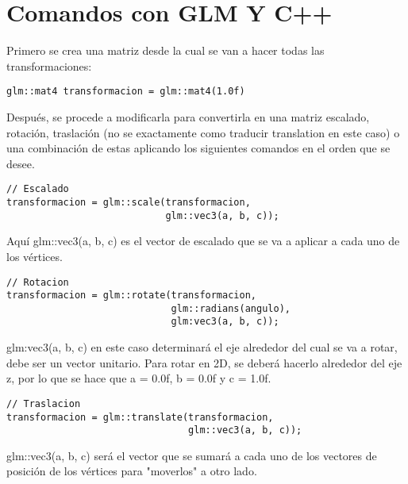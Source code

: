\section{Comandos con GLM Y C++}
Primero se crea una matriz desde la cual se van a hacer todas las
transformaciones:\par

\begin{lstlisting}
glm::mat4 transformacion = glm::mat4(1.0f)
\end{lstlisting}\par

Después, se procede a modificarla para convertirla en una matriz escalado, rotación, traslación 
(no se exactamente como traducir translation en este caso) o una combinación de estas aplicando
los siguientes comandos en el orden que se desee.

\begin{lstlisting}
// Escalado
transformacion = glm::scale(transformacion, 
                            glm::vec3(a, b, c));
\end{lstlisting}\par

Aquí glm::vec3(a, b, c) es el vector de escalado que se va a aplicar
a cada uno de los vértices.

\begin{lstlisting}
// Rotacion
transformacion = glm::rotate(transformacion,
                             glm::radians(angulo),
                             glm:vec3(a, b, c));
\end{lstlisting}\par

glm:vec3(a, b, c) en este caso determinará el eje alrededor
del cual se va a rotar, debe ser un vector unitario. Para
rotar en 2D, se deberá hacerlo alrededor del eje z, por lo que
se hace que a = 0.0f, b = 0.0f y c = 1.0f.

\begin{lstlisting}
// Traslacion
transformacion = glm::translate(transformacion, 
                                glm::vec3(a, b, c));
\end{lstlisting}\par

glm::vec3(a, b, c) será el vector que se sumará a cada uno de
los vectores de posición de los vértices para "moverlos" a otro
lado.